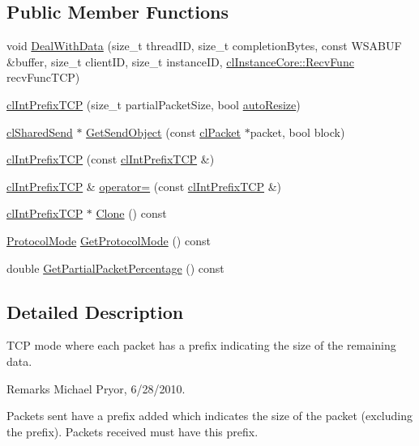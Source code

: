 \subsection*{Public Member Functions}
\begin{DoxyCompactItemize}
\item 
void \hyperlink{classcl_int_prefix_t_c_p_afed2d255e78f2e77e4a7f08ace22e5a9}{DealWithData} (size\_\-t threadID, size\_\-t completionBytes, const WSABUF \&buffer, size\_\-t clientID, size\_\-t instanceID, \hyperlink{classcl_instance_core_afa96c2a2c0b26b6a9256b87798bf9587}{clInstanceCore::RecvFunc} recvFuncTCP)
\item 
\hyperlink{classcl_int_prefix_t_c_p_ad2650c1c67a8c122f896586278def211}{clIntPrefixTCP} (size\_\-t partialPacketSize, bool \hyperlink{classcl_shared_t_c_p_aadfbe0c28871af737963ac9205a71a6c}{autoResize})
\item 
\hyperlink{classcl_shared_send}{clSharedSend} $\ast$ \hyperlink{classcl_int_prefix_t_c_p_ae6f1975b0ccd8939ccbede12bad64fd9}{GetSendObject} (const \hyperlink{classcl_packet}{clPacket} $\ast$packet, bool block)
\item 
\hyperlink{classcl_int_prefix_t_c_p_ae6d7db29f0205a5f9c29c17698319031}{clIntPrefixTCP} (const \hyperlink{classcl_int_prefix_t_c_p}{clIntPrefixTCP} \&)
\item 
\hyperlink{classcl_int_prefix_t_c_p}{clIntPrefixTCP} \& \hyperlink{classcl_int_prefix_t_c_p_aafc05cb89aee7a1b6fd4f44d9069e9ba}{operator=} (const \hyperlink{classcl_int_prefix_t_c_p}{clIntPrefixTCP} \&)
\item 
\hyperlink{classcl_int_prefix_t_c_p}{clIntPrefixTCP} $\ast$ \hyperlink{classcl_int_prefix_t_c_p_ae81f0dcab68dff359b1cdf5d03974350}{Clone} () const 
\item 
\hyperlink{classcl_shared_protocol_a4b0b9c82b8ae4eee78c6308c35afd47b}{ProtocolMode} \hyperlink{classcl_int_prefix_t_c_p_ae0abbe8a74edfe679b04df354aa023ec}{GetProtocolMode} () const 
\item 
double \hyperlink{classcl_int_prefix_t_c_p_a0579e1738807207877c316b7423e25d9}{GetPartialPacketPercentage} () const 
\end{DoxyCompactItemize}


\subsection{Detailed Description}
TCP mode where each packet has a prefix indicating the size of the remaining data. \begin{DoxyRemark}{Remarks}
Michael Pryor, 6/28/2010.
\end{DoxyRemark}
Packets sent have a prefix added which indicates the size of the packet (excluding the prefix). Packets received must have this prefix. \par
\par


